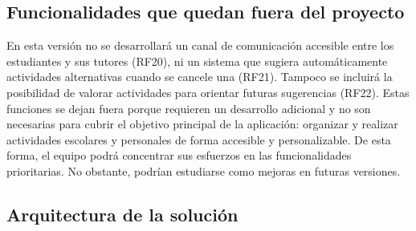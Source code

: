 \subsection{Funcionalidades que quedan fuera del proyecto}
En esta versión no se desarrollará un canal de comunicación accesible entre los estudiantes y sus tutores (RF20), ni un sistema que sugiera automáticamente actividades alternativas cuando se cancele una (RF21). Tampoco se incluirá la posibilidad de valorar actividades para orientar futuras sugerencias (RF22).
Estas funciones se dejan fuera porque requieren un desarrollo adicional y no son necesarias para cubrir el objetivo principal de la aplicación: organizar y realizar actividades escolares y personales de forma accesible y personalizable. De esta forma, el equipo podrá concentrar sus esfuerzos en las funcionalidades prioritarias. No obstante, podrían estudiarse como mejoras en futuras versiones.

\subsection{Arquitectura de la solución}

